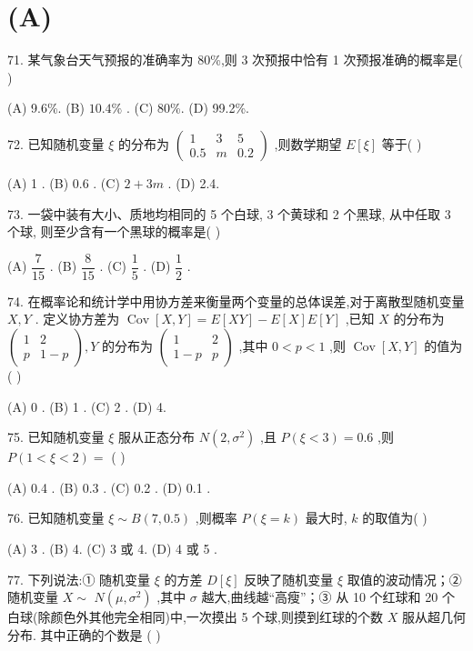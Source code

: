 \section*{(A)}

71. 某气象台天气预报的准确率为 80\%,则 3 次预报中恰有 1 次预报准确的概率是(   )

(A) 9.6\%. (B) ${10.4}\%$ . (C) 80\%. (D) 99.2\%.

72. 已知随机变量 $\xi$ 的分布为 $\left( \begin{matrix} 1 & 3 & 5 \\  {0.5} & m & {0.2} \end{matrix}\right)$ ,则数学期望 $E\left\lbrack  \xi \right\rbrack$ 等于(   )

(A) 1 . (B) 0.6 . (C) $2 + {3m}$ . (D) 2.4.

73. 一袋中装有大小、质地均相同的 5 个白球, 3 个黄球和 2 个黑球, 从中任取 3 个球, 则至少含有一个黑球的概率是(   )

(A) $\dfrac{7}{15}$ . (B) $\dfrac{8}{15}$ . (C) $\dfrac{1}{5}$ . (D) $\dfrac{1}{2}$ .

74. 在概率论和统计学中用协方差来衡量两个变量的总体误差,对于离散型随机变量 $X,Y$ . 定义协方差为 $\operatorname{Cov}\left\lbrack  {X,Y}\right\rbrack   = E\left\lbrack  {XY}\right\rbrack   - E\left\lbrack  X\right\rbrack  E\left\lbrack  Y\right\rbrack$ ,已知 $X$ 的分布为 $\left( \begin{matrix} 1 & 2 \\  p & 1 - p \end{matrix}\right) ,Y$ 的分布为 $\left( \begin{matrix} 1 & 2 \\  1 - p & p \end{matrix}\right)$ ,其中 $0 < p < 1$ ,则 $\operatorname{Cov}\left\lbrack  {X,Y}\right\rbrack$ 的值为 (   )

(A) 0 . (B) 1 . (C) 2 . (D) 4.

75. 已知随机变量 $\xi$ 服从正态分布 $N\left( {2,{\sigma }^{2}}\right)$ ,且 $P\left( {\xi  < 3}\right)  = {0.6}$ ,则 $P\left( {1 < \xi  < 2}\right)  =$ (   )

(A) 0.4 . (B) 0.3 . (C) 0.2 . (D) 0.1 .

76. 已知随机变量 $\xi  \sim  B\left( {7,{0.5}}\right)$ ,则概率 $P\left( {\xi  = k}\right)$ 最大时, $k$ 的取值为(   )

(A) 3 . (B) 4. (C) 3 或 4. (D) 4 或 5 .

77. 下列说法:① 随机变量 $\xi$ 的方差 $D\left\lbrack  \xi \right\rbrack$ 反映了随机变量 $\xi$ 取值的波动情况；② 随机变量 $X \sim$  $N\left( {\mu ,{\sigma }^{2}}\right)$ ,其中 $\sigma$ 越大,曲线越“高瘦”；③ 从 10 个红球和 20 个白球(除颜色外其他完全相同)中,一次摸出 5 个球,则摸到红球的个数 $X$ 服从超几何分布. 其中正确的个数是 (   )


